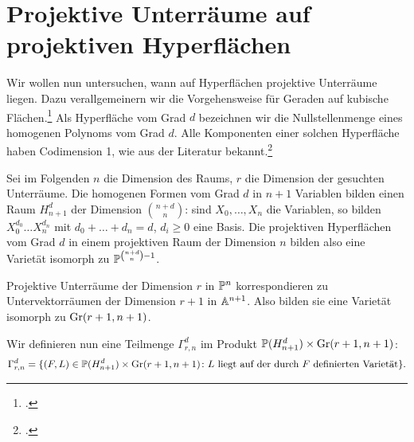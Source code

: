 \section{Projektive Unterräume auf projektiven Hyperflächen} \label{sec:linesproj}
Wir wollen nun untersuchen, wann auf Hyperflächen projektive Unterräume liegen. Dazu verallgemeinern wir die Vorgehensweise für Geraden auf kubische Flächen.\footcite[siehe][S.~78ff]{Shafarevich} Als Hyperfläche vom Grad $d$ bezeichnen wir die Nullstellenmenge eines homogenen Polynoms vom Grad $d$. Alle Komponenten einer solchen Hyperfläche haben Codimension 1, wie aus der Literatur bekannt.\footcite[siehe][S.~74, Theorem~4]{Shafarevich}

Sei im Folgenden $n$ die Dimension des Raums, $r$ die Dimension der gesuchten Unterräume. Die homogenen Formen vom Grad $d$ in $n+1$ Variablen bilden einen Raum $H_{n+1}^d$ der Dimension $\binom{n+d}{n}$: sind $X_0, \dots, X_n$ die Variablen, so bilden $X_0^{d_0} \dots X_n^{d_n}$ mit $d_0 + \dots + d_n = d$, $d_i \geq 0$ eine Basis. Die projektiven Hyperflächen vom Grad $d$ in einem projektiven Raum der Dimension $n$ bilden also eine Varietät isomorph zu $\mathbb P^{\binom{n+d}{n} - 1}$.

Projektive Unterräume der Dimension $r$ in $\mathbb P^{n}$ korrespondieren zu Untervektorräumen der Dimension $r+1$ in $\mathbb A^{n+1}$. Also bilden sie eine Varietät isomorph zu $\grass r+1/{n+1}$.

Wir definieren nun eine Teilmenge $\Gamma_{r,n}^d$ im Produkt $\mathbb P(H_{n+1}^d) \times \grass r+1/{n+1}$:
\begin{equation}
\Gamma_{r,n}^d = \{(F,L) \in \mathbb P(H_{n+1}^d) \times \grass r+1/{n+1} \colon \text{$L$ liegt auf der durch $F$ definierten Varietät} \}.
\end{equation}

